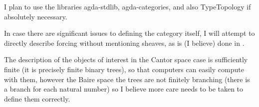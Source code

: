 \documentclass{article}
\begin{document}
I plan to use the libraries agda-stdlib\cite{stdlib}, agda-categories\cite{catlib}, and also TypeTopology\cite{tytop} if absolutely necessary.

In case there are significant issues to defining the category itself,
I will attempt to directly describe forcing without mentioning sheaves,
as is (I believe) done in \cite{coquand}.

The description of the objects of interest in the Cantor space case is sufficiently finite
(it is precisely finite binary trees), so that computers can easily compute with them,
however the Baire space the trees are not finitely branching
(there is a branch for each natural number) so I believe more care needs
to be taken to define them correctly.

\printbibliography
\end{document}
